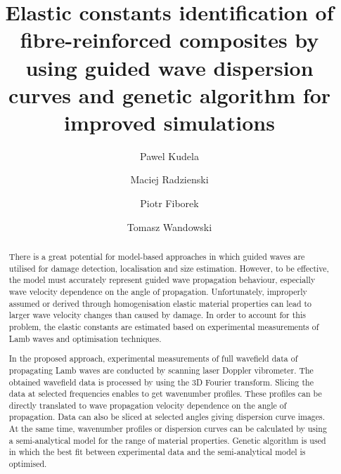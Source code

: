 \documentclass[preprint,12pt]{elsarticle}
\begin{document}
	\begin{frontmatter}
		
		\title{Elastic constants identification of fibre-reinforced composites by using guided wave dispersion curves and genetic algorithm for improved simulations}
		
		\address[IFFM]{Institute of Fluid Flow Machinery, Polish Academy of Sciences, Poland}
		
		\author{Pawel Kudela}
		\author{Maciej Radzienski}
		\author{Piotr Fiborek }
		\author{Tomasz Wandowski }	
		
		
\begin{abstract}
There is a great potential for model-based approaches in which guided waves are utilised for damage detection, localisation and size estimation. 
However, to be effective, the model must accurately represent guided wave propagation behaviour, especially wave velocity dependence on the angle of propagation. 
Unfortunately, improperly assumed or derived through homogenisation elastic material properties can lead to larger wave velocity changes than caused by damage. 
In order to account for this problem, the elastic constants are estimated based on experimental measurements of Lamb waves and optimisation techniques. 

In the proposed approach, experimental measurements of full wavefield data of propagating Lamb
waves are conducted by scanning laser Doppler vibrometer. 
The obtained wavefield data is processed by using the 3D Fourier transform. 
Slicing the data at selected frequencies enables to get wavenumber profiles. 
These profiles can be directly translated to wave propagation velocity dependence on the angle of propagation. 
Data can also be sliced at selected angles giving dispersion curve images. 
At the same time, wavenumber profiles or dispersion curves can be calculated by using a semi-analytical model for the range of material properties. 
Genetic algorithm is used in which the best fit between experimental data and the semi-analytical model is optimised.


\end{abstract}
\end{frontmatter}
\end{document}
